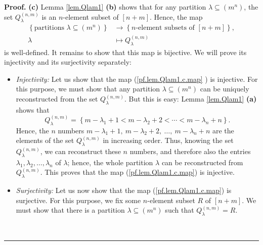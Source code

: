 \documentclass[numbers=enddot,12pt,final,onecolumn,notitlepage]{scrartcl}%
\theoremstyle{definition}
\newenvironment{proof}[1][Proof]{\noindent\textbf{#1.} }{\ \rule{0.5em}{0.5em}}
\begin{document}
\begin{enumerate}
\begin{proof}
\textbf{(c)} Lemma \ref{lem.Qlam1} \textbf{(b)} shows that for any partition
$\lambda\subseteq\left(  m^{n}\right)  $, the set $Q_{\lambda}^{\left(
n,m\right)  }$ is an $n$-element subset of $\left[  n+m\right]  $. Hence, the
map%
\begin{align}
\left\{  \text{partitions }\lambda\subseteq\left(  m^{n}\right)  \right\}   &
\rightarrow\left\{  n\text{-element subsets of }\left[  n+m\right]  \right\}
,\nonumber\\
\lambda &  \mapsto Q_{\lambda}^{\left(  n,m\right)  }
\label{pf.lem.Qlam1.c.map}%
\end{align}
is well-defined. It remains to show that this map is bijective. We will prove
its injectivity and its surjectivity separately:

\begin{itemize}
\item \textit{Injectivity:} Let us show that the map (\ref{pf.lem.Qlam1.c.map}%
) is injective. For this purpose, we must show that any partition
$\lambda\subseteq\left(  m^{n}\right)  $ can be uniquely reconstructed from
the set $Q_{\lambda}^{\left(  n,m\right)  }$. But this is easy: Lemma
\ref{lem.Qlam1} \textbf{(a)} shows that
\[
Q_{\lambda}^{\left(  n,m\right)  }=\left\{  m-\lambda_{1}+1<m-\lambda
_{2}+2<\cdots<m-\lambda_{n}+n\right\}  .
\]
Hence, the $n$ numbers $m-\lambda_{1}+1,\ m-\lambda_{2}+2,\ \ldots
,\ m-\lambda_{n}+n$ are the elements of the set $Q_{\lambda}^{\left(
n,m\right)  }$ in increasing order. Thus, knowing the set $Q_{\lambda
}^{\left(  n,m\right)  }$, we can reconstruct these $n$ numbers, and therefore
also the entries $\lambda_{1},\lambda_{2},\ldots,\lambda_{n}$ of $\lambda$;
hence, the whole partition $\lambda$ can be reconstructed from $Q_{\lambda
}^{\left(  n,m\right)  }$. This proves that the map (\ref{pf.lem.Qlam1.c.map})
is injective.

\item \textit{Surjectivity:} Let us now show that the map
(\ref{pf.lem.Qlam1.c.map}) is surjective. For this purpose, we fix some
$n$-element subset $R$ of $\left[  n+m\right]  $. We must show that there is a
partition $\lambda\subseteq\left(  m^{n}\right)  $ such that $Q_{\lambda
}^{\left(  n,m\right)  }=R$.


\end{itemize}
\end{proof}
\end{enumerate}
\end{document}
